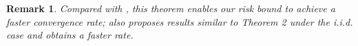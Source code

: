 \documentclass{article}
\def\eE{\mathbb{E}}
\def\pP{\mathbb{P}}
\def\defeq{\overset{\textup{def}}{=}}
\newtheorem{theorem}{Theorem}
\newtheorem*{remark}{Remark}
\begin{document}
\begin{remark}
    Compared with \cite{wu2023macro-auc}, this theorem enables our risk bound to achieve a faster convergence rate; \cite{watkins2023optimistic} also proposes results similar to Theorem 2 under the i.i.d. case and obtains a faster rate.
\end{remark}





        
                
\end{document}
